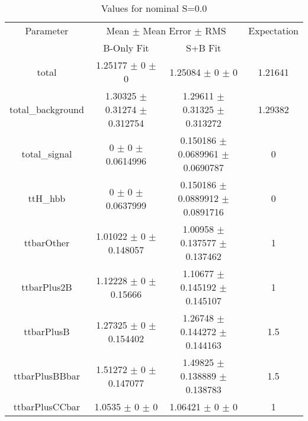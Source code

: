 \begin{table}
\centering
\caption{Values for nominal S=0.0}
\begin{tabular}{cccc}
\toprule
Parameter & \multicolumn{2}{c}{Mean $\pm$ Mean Error $\pm$ RMS} & Expectation\\
 & B-Only Fit & S+B Fit & \\
\midrule
total & \num{1.25177} $\pm$ \num{0} $\pm$ \num{0} & \num{1.25084} $\pm$ \num{0} $\pm$ \num{0} & \num{1.21641}\\
total\_background & \num{1.30325} $\pm$ \num{0.31274} $\pm$ \num{0.312754} & \num{1.29611} $\pm$ \num{0.31325} $\pm$ \num{0.313272} & \num{1.29382}\\
total\_signal & \num{0} $\pm$ \num{0} $\pm$ \num{0.0614996} & \num{0.150186} $\pm$ \num{0.0689961} $\pm$ \num{0.0690787} & \num{0}\\
ttH\_hbb & \num{0} $\pm$ \num{0} $\pm$ \num{0.0637999} & \num{0.150186} $\pm$ \num{0.0889912} $\pm$ \num{0.0891716} & \num{0}\\
ttbarOther & \num{1.01022} $\pm$ \num{0} $\pm$ \num{0.148057} & \num{1.00958} $\pm$ \num{0.137577} $\pm$ \num{0.137462} & \num{1}\\
ttbarPlus2B & \num{1.12228} $\pm$ \num{0} $\pm$ \num{0.15666} & \num{1.10677} $\pm$ \num{0.145192} $\pm$ \num{0.145107} & \num{1}\\
ttbarPlusB & \num{1.27325} $\pm$ \num{0} $\pm$ \num{0.154402} & \num{1.26748} $\pm$ \num{0.144272} $\pm$ \num{0.144163} & \num{1.5}\\
ttbarPlusBBbar & \num{1.51272} $\pm$ \num{0} $\pm$ \num{0.147077} & \num{1.49825} $\pm$ \num{0.138889} $\pm$ \num{0.138783} & \num{1.5}\\
ttbarPlusCCbar & \num{1.0535} $\pm$ \num{0} $\pm$ \num{0} & \num{1.06421} $\pm$ \num{0} $\pm$ \num{0} & \num{1}\\
\bottomrule
\end{tabular}
\end{table}